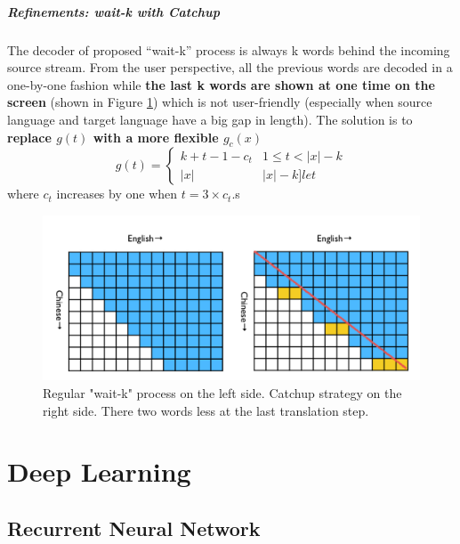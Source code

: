 \documentclass[a3paper, 12pt]{book} %
\newcommand\bolden[1]{{\boldmath\bfseries#1}}
\begin{document}
\subsubsection{Refinements: wait-k with Catchup}
The decoder of proposed “wait-k” process is always k words behind the incoming source stream. From the user perspective, all the previous words are decoded in a one-by-one fashion while \textbf{the last k words are shown at one time on the screen} (shown in Figure \ref{fig:stacl_catchup}) which is not user-friendly (especially when source language and target language have a big gap in length). The solution is to \bolden{replace $g(t)$ with a more flexible $g_c(x)$}
\begin{equation}
g(t)=
\left\{
\begin{array}{lr}
k+t-1 -c_t & 1 \le t < |x| - k\\
|x|& |x| - k ]le t 
\end{array}
\right.
\end{equation}
where $c_t$ increases by one when $t=3\times c_t$.s
\begin{figure}[htpb]
	\centering
	\includegraphics[width=\linewidth]{figures/stacl_catchup.png}
	\caption{Regular "wait-k" process on the left side. Catchup strategy on the right side. There two words less at the last translation step.}
	\label{fig:stacl_catchup}
\end{figure}

\part{Deep Learning}

\chapter{Recurrent Neural Network}
\end{document}
